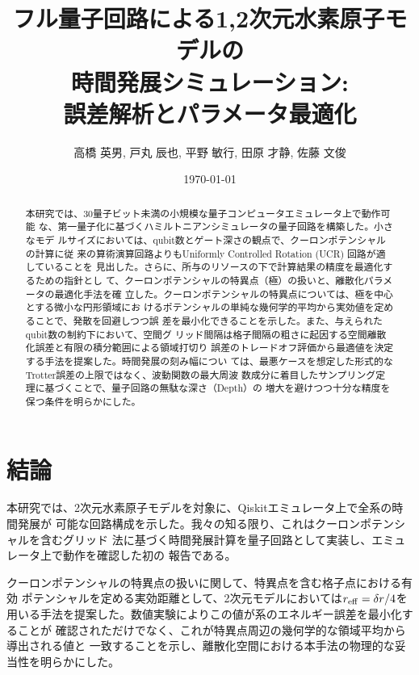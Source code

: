 \documentclass[fontsize=11pt]{jlreq}
\begin{document}
\title
{フル量子回路による1,2次元水素原子モデルの\\
時間発展シミュレーション:\\誤差解析とパラメータ最適化}
\author{高橋 英男, 戸丸 辰也, 平野 敏行, 田原 才静, 佐藤 文俊}
\date{\today}
\maketitle
\begin{abstract}
本研究では、30量子ビット未満の小規模な量子コンピュータエミュレータ上で動作可能
な、第一量子化に基づくハミルトニアンシミュレータの量子回路を構築した。小さなモデ
ルサイズにおいては、qubit数とゲート深さの観点で、クーロンポテンシャルの計算に従
来の算術演算回路よりもUniformly Controlled Rotation (UCR) 回路が適していることを
見出した。さらに、所与のリソースの下で計算結果の精度を最適化するための指針とし
て、クーロンポテンシャルの特異点（極）の扱いと、離散化パラメータの最適化手法を確
立した。クーロンポテンシャルの特異点については、極を中心とする微小な円形領域にお
けるポテンシャルの単純な幾何学的平均から実効値を定めることで、発散を回避しつつ誤
差を最小化できることを示した。また、与えられたqubit数の制約下において、空間グ
リッド間隔は格子間隔の粗さに起因する空間離散化誤差と有限の積分範囲による領域打切り
誤差のトレードオフ評価から最適値を決定する手法を提案した。時間発展の刻み幅につい
ては、最悪ケースを想定した形式的なTrotter誤差の上限ではなく、波動関数の最大周波
数成分に着目したサンプリング定理に基づくことで、量子回路の無駄な深さ（Depth）の
増大を避けつつ十分な精度を保つ条件を明らかにした。
\end{abstract}






\section{結論}
本研究では、2次元水素原子モデルを対象に、Qiskitエミュレータ上で全系の時間発展が
可能な回路構成を示した。我々の知る限り、これはクーロンポテンシャルを含むグリッド
法に基づく時間発展計算を量子回路として実装し、エミュレータ上で動作を確認した初の
報告である。

クーロンポテンシャルの特異点の扱いに関して、特異点を含む格子点における有効
ポテンシャルを定める実効距離として、2次元モデルにおいては$r_{\mathrm{eff}}=\delta r/4$を
用いる手法を提案した。数値実験によりこの値が系のエネルギー誤差を最小化することが
確認されただけでなく、これが特異点周辺の幾何学的な領域平均から導出される値と
一致することを示し、離散化空間における本手法の物理的な妥当性を明らかにした。
\end{document}
